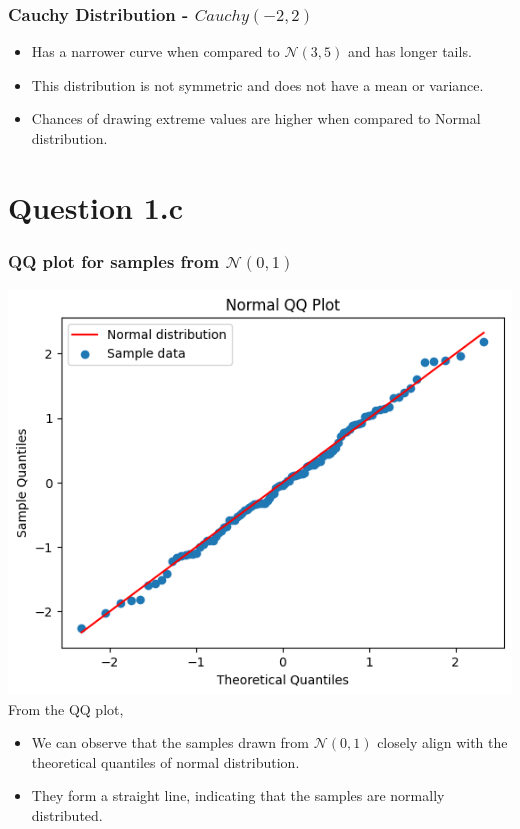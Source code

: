 \documentclass[12pt]{article}
\begin{document}
\subsubsection*{Cauchy Distribution - \(Cauchy(-2, 2)\)}
\begin{itemize}
    \item Has a narrower curve when compared to \(\mathcal{N}(3, 5)\) and has
    longer tails.
    \item This distribution is not symmetric and does not have a mean or variance.
    \item Chances of drawing extreme values are higher when compared to Normal distribution.
\end{itemize}

\newpage
\section*{Question 1.c}
\subsubsection*{QQ plot for samples from \(\mathcal{N}(0, 1)\)}
\includegraphics*[width=\linewidth]{graph1c}
From the QQ plot,
\begin{itemize}
    \item We can observe that the samples drawn from \(\mathcal{N}(0, 1)\)
closely align with the theoretical quantiles of normal distribution.
    \item They form a straight line, indicating that the samples are normally
    distributed.
\end{itemize}
\end{document}
